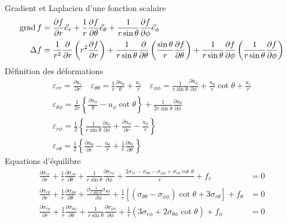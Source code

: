 Gradient et Laplacien d'une fonction scalaire
\begin{align*}
    \operatorname*{\mathrm{grad}} f &= \frac{\partial f}{\partial r} \vec{e}_r + \frac{1}{r} \frac{\partial f}{\partial \theta} \vec{e}_{\theta} + \frac{1}{r\sin \theta} \frac{\partial f}{\partial \phi} \vec{e}_{\phi} \\
    \Delta f &= \frac{1}{r^2} \frac{\partial}{\partial r} \left( r^2 \frac{\partial f}{\partial r} \right) + \frac{1}{r\sin \theta} \frac{\partial}{\partial \theta}\left( \frac{\sin \theta}{r} \frac{\partial f}{\partial \theta} \right) + \frac{1}{r\sin \theta}\frac{\partial f}{\partial \phi} \left( \frac{1}{r\sin \theta} \frac{\partial f}{\partial \phi} \right)
\end{align*}
Définition des déformations
\begin{displaymath}
\begin{split}
    \varepsilon_{rr} = \frac{\partial u_r}{\partial r} \quad \varepsilon_{\theta\theta} = \frac{1}{r} \frac{\partial u_{\theta}}{\theta} + \frac{u_r}{r} \quad \varepsilon_{\phi\phi} = \frac{1}{r \sin \theta} \frac{\partial u_{\phi}}{\partial \phi} + \frac{u_{\theta}}{r}\cot \theta + \frac{u_r}{r} \\
    \varepsilon_{\theta \phi} = \frac{1}{2r} \left\{ \frac{\partial u_{\phi}}{\theta} - u_{\phi} \cot \theta \right\} + \frac{1}{2r\sin \theta} \frac{\partial u_{\theta}}{\partial \phi} \\
    \varepsilon_{r\phi} = \frac{1}{2} \left\{ \frac{1}{r \sin \theta} \frac{\partial u_r}{\partial \phi} + \frac{\partial u_\phi}{\partial r} - \frac{u_{\phi}}{r}\right\} \\
    \varepsilon_{r\theta} = \frac{1}{2} \left\{ \frac{\partial u_{\theta}}{\partial r} - \frac{u_{\theta}}{r} + \frac{1}{r} \frac{\partial u_r}{\partial \theta} \right\}
\end{split}
\end{displaymath}
Equations d'équilibre
\begin{align*}
    \frac{\partial \sigma_{rr}}{\partial r} + \frac{1}{r} \frac{\partial \sigma_{r\theta}}{\partial \theta} + \frac{1}{r \sin \theta} \frac{\partial \sigma_{r\phi}}{\partial \phi} + \frac{2 \sigma_{rr} - \sigma_{\theta\theta} -\sigma_{\phi\phi} +\sigma_{r\theta} \cot \theta}{r} + f_r &=0\\
    \frac{\partial \sigma_{r\theta}}{\partial r} + \frac{1}{r} \frac{\partial \sigma_{\theta\theta}}{\partial \theta} + \frac{\partial \frac{1}{r \sin \theta} \sigma_{\theta \phi}}{\partial \phi} + \frac{1}{r} \left[ \left( \sigma_{\theta\theta} -\sigma_{\phi\phi} \right)\cot\theta +3\sigma_{r\theta} \right]+ f_{\theta} &=0\\
    \frac{\partial \sigma_{r\phi}}{\partial r} + \frac{1}{r} \frac{\partial \sigma_{\theta \phi}}{\partial \theta} + \frac{1}{r \sin \theta} \frac{\partial \sigma_{\phi\phi}}{\partial \phi} + \frac{1}{r}\left( 3\sigma_{r\phi} + 2 \sigma_{\theta\phi}\cot \theta \right) + f_\phi &=0
\end{align*}

